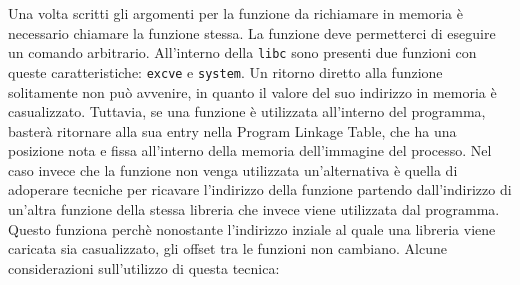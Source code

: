 Una volta scritti gli argomenti per la funzione da richiamare in
memoria è necessario chiamare la funzione stessa. La funzione deve
permetterci di eseguire un comando arbitrario. All'interno della
\lstinline{libc} sono presenti due funzioni con queste
caratteristiche: \lstinline{excve} e \lstinline{system}. Un ritorno
diretto alla funzione solitamente non può avvenire, in quanto il
valore del suo indirizzo in memoria è casualizzato. Tuttavia, se una
funzione è utilizzata all'interno del programma, basterà ritornare
alla sua entry nella Program Linkage Table, che ha una posizione nota
e fissa all'interno della memoria dell'immagine del processo. Nel caso
invece che la funzione non venga utilizzata un'alternativa è quella di
adoperare tecniche per ricavare l'indirizzo della funzione partendo
dall'indirizzo di un'altra funzione della stessa libreria che invece
viene utilizzata dal programma. Questo funziona perchè nonostante
l'indirizzo inziale al quale una libreria viene caricata sia
casualizzato, gli offset tra le funzioni non cambiano. Alcune
considerazioni sull'utilizzo di questa tecnica:

